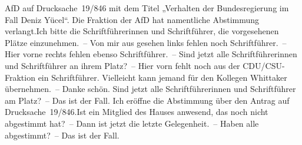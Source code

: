 \documentclass{article}
\begin{document}
AfD auf Drucksache 19/846 mit dem Titel „Verhalten der Bundesregierung im Fall Deniz Yücel“. Die Fraktion der AfD hat namentliche Abstimmung verlangt.Ich bitte die Schriftführerinnen und Schriftführer, die vorgesehenen Plätze einzunehmen. – Von mir aus gesehen links fehlen noch Schriftführer. – Hier vorne rechts fehlen ebenso Schriftführer. – Sind jetzt alle Schriftführerinnen und Schriftführer an ihrem Platz? – Hier vorn fehlt noch aus der CDU/CSU-Fraktion ein Schriftführer. Vielleicht kann jemand für den Kollegen Whittaker übernehmen. – Danke schön. Sind jetzt alle Schriftführerinnen und Schriftführer am Platz? – Das ist der Fall. Ich eröffne die Abstimmung über den Antrag auf Drucksache 19/846.Ist ein Mitglied des Hauses anwesend, das noch nicht abgestimmt hat? – Dann ist jetzt die letzte Gelegenheit. – Haben alle abgestimmt? – Das ist der Fall.
\end{document}
